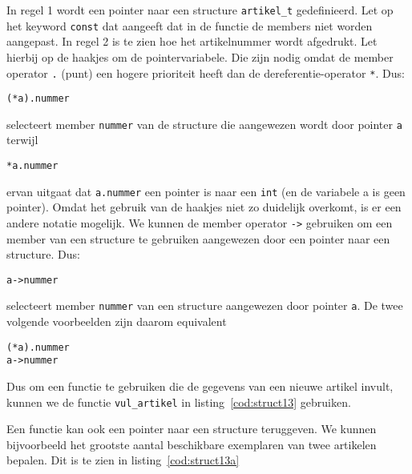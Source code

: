 In regel 1 wordt een pointer naar een structure \texttt{artikel\_t} gedefinieerd. Let op het keyword \texttt{const} dat aangeeft dat in de functie de members niet worden aangepast. In regel 2 is te zien hoe het artikelnummer wordt afgedrukt. Let hierbij op de haakjes om de pointervariabele. Die zijn nodig omdat de member operator \texttt{.} (punt) een hogere prioriteit heeft dan de dereferentie-operator \texttt{*}. Dus:

\hspace*{1em}\texttt{(*a).nummer}

selecteert member \texttt{nummer} van de structure die aangewezen wordt door pointer \texttt{a} terwijl

\hspace*{1em}\texttt{*a.nummer}

ervan uitgaat dat \texttt{a.nummer} een pointer is naar een \texttt{int} (en de variabele a is geen pointer).
Omdat het gebruik van de haakjes niet zo duidelijk overkomt, is er een andere notatie mogelijk. We kunnen de member operator \texttt{->}\indexop{->} gebruiken om een member van een structure te gebruiken aangewezen door een pointer naar een structure. Dus:

\hspace*{1em}\texttt{a->nummer}

selecteert member \texttt{nummer} van een structure aangewezen door pointer \texttt{a}. De twee volgende voorbeelden zijn daarom equivalent

\hspace*{1em}\texttt{(*a).nummer}\\
\hspace*{1em}\texttt{a->nummer}

Dus om een functie te gebruiken die de gegevens van een nieuwe artikel invult, kunnen we de functie \texttt{vul\_artikel} in listing~\ref{cod:struct13} gebruiken.


Een functie kan ook een pointer naar een structure teruggeven. We kunnen bijvoorbeeld het grootste aantal beschikbare exemplaren van twee artikelen bepalen. Dit is te zien in listing~\ref{cod:struct13a}


